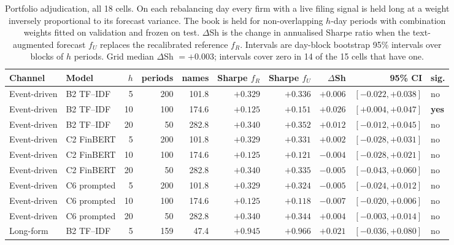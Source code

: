 \begin{table}[htbp]
\centering
\caption[Portfolio economics: all 18 cells]{Portfolio adjudication, all
18 cells. On each rebalancing day every firm with a live filing signal
is held long at a weight inversely proportional to its forecast
variance. The book is held for non-overlapping $h$-day periods with
combination weights fitted on validation and frozen on test. $\Delta$Sh
is the change in annualised Sharpe ratio \cite{sharpe1966mutual} when
the text-augmented forecast $f_U$ replaces the recalibrated reference
$f_R$. Intervals are day-block bootstrap 95\% intervals over blocks of
$h$ periods. Grid median $\Delta$Sh $= +0.003$; intervals cover zero in
14 of the 15 cells that have one.}
\label{tab:app-sharpe}
\singlespacing\small
\setlength{\tabcolsep}{3pt}
\begin{tabular}{@{}llrrrrrrrl@{}}
\toprule
Channel & Model & $h$ & periods & names & Sharpe $f_R$ & Sharpe $f_U$ & $\Delta$Sh & 95\% CI & sig. \\
\midrule
Event-driven & B2 TF--IDF   &  5 & 200 & 101.8 & $+0.329$ & $+0.336$ & $+0.006$ & $[-0.022,+0.038]$ & no \\
Event-driven & B2 TF--IDF   & 10 & 100 & 174.6 & $+0.125$ & $+0.151$ & $+0.026$ & $[+0.004,+0.047]$ & \textbf{yes} \\
Event-driven & B2 TF--IDF   & 20 &  50 & 282.8 & $+0.340$ & $+0.352$ & $+0.012$ & $[-0.012,+0.045]$ & no \\
Event-driven & C2 FinBERT   &  5 & 200 & 101.8 & $+0.329$ & $+0.331$ & $+0.002$ & $[-0.028,+0.031]$ & no \\
Event-driven & C2 FinBERT   & 10 & 100 & 174.6 & $+0.125$ & $+0.121$ & $-0.004$ & $[-0.028,+0.021]$ & no \\
Event-driven & C2 FinBERT   & 20 &  50 & 282.8 & $+0.340$ & $+0.335$ & $-0.005$ & $[-0.043,+0.060]$ & no \\
Event-driven & C6 prompted  &  5 & 200 & 101.8 & $+0.329$ & $+0.324$ & $-0.005$ & $[-0.024,+0.012]$ & no \\
Event-driven & C6 prompted  & 10 & 100 & 174.6 & $+0.125$ & $+0.118$ & $-0.007$ & $[-0.020,+0.006]$ & no \\
Event-driven & C6 prompted  & 20 &  50 & 282.8 & $+0.340$ & $+0.344$ & $+0.004$ & $[-0.003,+0.014]$ & no \\
Long-form    & B2 TF--IDF   &  5 & 159 &  47.4 & $+0.945$ & $+0.966$ & $+0.021$ & $[-0.036,+0.080]$ & no \\

\end{tabular}
\end{table}
